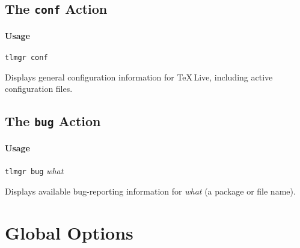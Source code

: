 \documentclass[11pt]{article}
\begin{document}
\clearpage

\subsection{The {\tt conf} Action}
\label{conf}
\paragraph{Usage}
\begin{list}{}{}
\item \texttt{tlmgr conf}
\end{list}

Displays general configuration information for \TeX\,Live, including active configuration files.

\clearpage

\subsection{The {\tt bug} Action}
\label{bug}
\paragraph{Usage}
\begin{list}{}{}
\item\texttt{tlmgr bug} \textsl{what}
\end{list}

Displays available bug-reporting information for \textsl{what} (a package or file name). 

\clearpage

\clearpage
\section{Global Options}
\label{GlobalOptions}
\end{document}
